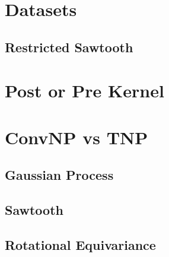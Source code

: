 \documentclass[../../main.tex]{subfiles}
\begin{document}
\section{Datasets}

\subsection{Restricted Sawtooth}


\section{Post or Pre Kernel}

\section{ConvNP vs TNP}

\subsection{Gaussian Process}

\subsection{Sawtooth}

\subsection{Rotational Equivariance}


\ifSubfilesClassLoaded{%
    \printbibliography{}
}{} 
\end{document}
